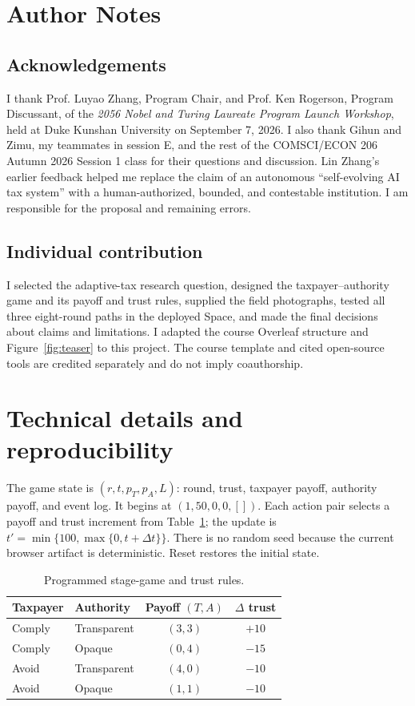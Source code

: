 \clearpage\nobalance
\section*{Author Notes}
\subsection*{Acknowledgements}
I thank Prof. Luyao Zhang, Program Chair, and Prof. Ken Rogerson, Program Discussant, of the \emph{2056 Nobel and Turing Laureate Program Launch Workshop}, held at Duke Kunshan University on September 7, 2026. I also thank Gihun and Zimu, my teammates in session E, and the rest of the COMSCI/ECON 206 Autumn 2026 Session 1 class for their questions and discussion. Lin Zhang's earlier feedback helped me replace the claim of an autonomous ``self-evolving AI tax system'' with a human-authorized, bounded, and contestable institution. I am responsible for the proposal and remaining errors.
\subsection*{Individual contribution}
I selected the adaptive-tax research question, designed the taxpayer--authority game and its payoff and trust rules, supplied the field photographs, tested all three eight-round paths in the deployed Space, and made the final decisions about claims and limitations. I adapted the course Overleaf structure and Figure~\ref{fig:teaser} to this project. The course template and cited open-source tools are credited separately and do not imply coauthorship.


\appendix
\section{Technical details and reproducibility}
The game state is $(r,t,p_T,p_A,L)$: round, trust, taxpayer payoff, authority payoff, and event log. It begins at $(1,50,0,0,[])$. Each action pair selects a payoff and trust increment from Table~\ref{tab:rules}; the update is $t'=\min\{100,\max\{0,t+\Delta t\}\}$. There is no random seed because the current browser artifact is deterministic. Reset restores the initial state.

\begin{table}[h]
\caption{Programmed stage-game and trust rules.}
\label{tab:rules}
\centering
\begin{tabular}{@{}llcc@{}}\toprule
Taxpayer & Authority & Payoff $(T,A)$ & $\Delta$ trust\\\midrule
Comply & Transparent & $(3,3)$ & $+10$\\
Comply & Opaque & $(0,4)$ & $-15$\\
Avoid & Transparent & $(4,0)$ & $-10$\\
Avoid & Opaque & $(1,1)$ & $-10$\\\bottomrule
\end{tabular}
\end{table}

